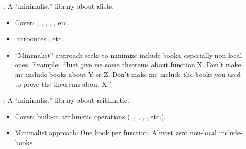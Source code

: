 
\begin{frame}

\newlibtitle

:
A ``minimalist'' library about alists.
\begin{itemize}
\item  Covers , , , , , etc.
\item Introduces , etc.
\item ``Minimalist'' approach seeks to minimize include-books, especially non-local ones. Example: ``Just give me some theorems about function X.  Don't make me include books about Y or Z.  Don't make me include the books you used to prove the theorems about X.''
\end{itemize}

\separation

:
A ``minimalist'' library about arithmetic.
\begin{itemize}
\item Covers built-in arithmetic operations (\code{+}, \code{*}, , , , etc.).
\item Minimalist approach: One book per function.  Almost zero non-local include-books.
\end{itemize}

\end{frame}


